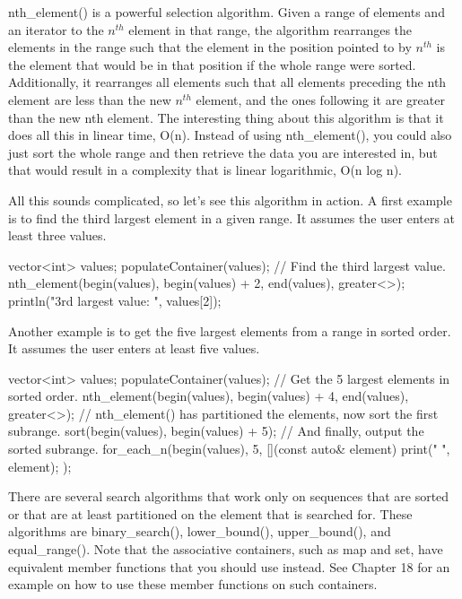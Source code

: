 nth\_element() is a powerful selection algorithm. Given a range of elements and an iterator to the $n^{th}$ element in that range, the algorithm rearranges the elements in the range such that the element in the position pointed to by $n^{th}$ is the element that would be in that position if the whole range were sorted. Additionally, it rearranges all elements such that all elements preceding the nth element are less than the new $n^{th}$ element, and the ones following it are greater than the new nth element. The interesting thing about this algorithm is that it does all this in linear time, O(n). Instead of using nth\_element(), you could also just sort the whole range and then retrieve the data you are interested in, but that would result in a complexity that is linear logarithmic, O(n log n).

All this sounds complicated, so let’s see this algorithm in action. A first example is to find the third largest element in a given range. It assumes the user enters at least three values.

\begin{cpp}
vector<int> values;
populateContainer(values);
// Find the third largest value.
nth_element(begin(values), begin(values) + 2, end(values), greater<>{});
println("3rd largest value: {}", values[2]);
\end{cpp}

Another example is to get the five largest elements from a range in sorted order. It assumes the user enters at least five values.

\begin{cpp}
vector<int> values;
populateContainer(values);
// Get the 5 largest elements in sorted order.
nth_element(begin(values), begin(values) + 4, end(values), greater<>{});
// nth_element() has partitioned the elements, now sort the first subrange.
sort(begin(values), begin(values) + 5);
// And finally, output the sorted subrange.
for_each_n(begin(values), 5, [](const auto& element) { print("{} ", element); });
\end{cpp}


There are several search algorithms that work only on sequences that are sorted or that are at least partitioned on the element that is searched for. These algorithms are binary\_search(), lower\_bound(), upper\_bound(), and equal\_range(). Note that the associative containers, such as map and set, have equivalent member functions that you should use instead. See Chapter 18 for an example on how to use these member functions on such containers.


